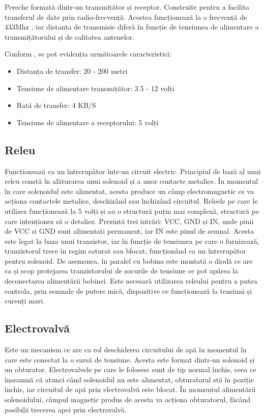 	Pereche formată dintr-un transmițător și receptor. Construite pentru a facilita transferul de date prin radio-frecvență. Acestea funcționează la o frecvență de 433Mhz \cite{rfModule}, iar distanța de transmisie diferă în funcție de tensiunea de alimentare a transmițătorului și de calitatea antenelor.

	Conform \cite{rfModule}, se pot evidenția următoarele caracteristici:
 		\begin{itemize}
			\setlength{\itemindent}{2em}
			\itemsep0em
			\item Distanța de transfer: 20 - 200 metri
			\item Tensiune de alimentare transmițător: 3.5 - 12 volți
			\item Rată de transfer: 4 KB/S
			\item Tensiune de alimentare a receptorului: 5 volți
		\end{itemize} 

\subsection{Releu}

	Funcționează ca un întrerupător într-un circuit electric. Principiul de bază al unui releu constă în alăturarea unui solenoid și a unor contacte metalice. În momentul în care solenoidul este alimentat, acesta produce un câmp electromagnetic ce va acționa contactele metalice, deschizând sau închizând circuitul. Releele pe care le utilizez funcționează la 5 volți și au o structură puțin mai complexă, structură pe care intenționez să o detaliez. Prezintă trei intrări: VCC, GND și IN, unde pinii de VCC si GND sunt alimentați permanent, iar IN este pinul de semnal. Acesta este legat la baza unui tranzistor, iar în funcție de tensiunea pe care o furnizează, tranzistorul trece în regim saturat sau blocat, funcționând ca un întrerupător pentru solenoid. De asemenea, în paralel cu bobina este montată o diodă ce are ca și scop protejarea tranzistorului de șocurile de tensiune ce pot apărea la deconectarea alimentării bobinei. Este necesară utilizarea releului pentru a putea controla, prin semnale de putere mică, dispozitive ce funcționează la tensiuni și curenți mari. 

\subsection{Electrovalvă}

	Este un mecanism ce are ca rol deschiderea circuitului de apă în momentul în care este conectat la o sursă de tensiune. Acesta este format dintr-un solenoid și un obturator. Electrovalvele pe care le folosesc sunt de tip normal închis, ceea ce înseamnă că atunci când solenoidul nu este alimentat, obturatorul stă în poziție închis, iar circuitul de apă prin electrovalvă este blocat. În momentul alimentării solenoidului, câmpul magnetic produs de acesta va acționa obturatorul, făcând posibilă trecerea apei prin electrovalvă.

